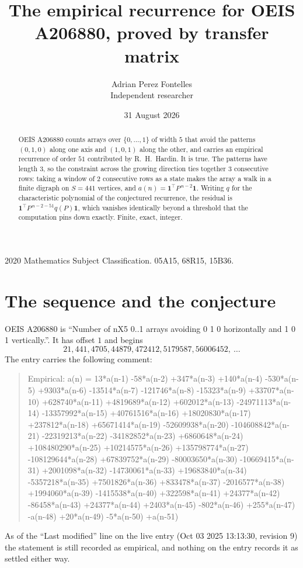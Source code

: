 \documentclass[11pt,a4paper]{article}
\title{The empirical recurrence for OEIS A206880, proved by transfer matrix}
\author{Adrian Perez Fontelles\\ \small Independent researcher}
\date{31 August 2026}
\theoremstyle{plain}
\theoremstyle{definition}
\begin{document}
\maketitle

\begin{abstract}
OEIS A206880 counts arrays over $\{0,\dots,1\}$ of width $5$ that avoid the patterns
$(0,1,0)$ along one axis and $(1,0,1)$ along the other, and carries an empirical recurrence of
order $51$ contributed by R.~H.~Hardin. It is true. The patterns have length $3$, so
the constraint across the growing direction ties together $3$ consecutive rows: taking a
window of $2$ consecutive rows as a state makes the array a walk in a finite digraph
on $S=441$ vertices, and $a(n)=\mathbf{1}^{\!\top}P^{\,n-2}\mathbf{1}$. Writing $q$
for the characteristic polynomial of the conjectured recurrence, the residual is
$\mathbf{1}^{\!\top}P^{\,n-2-51}q(P)\mathbf{1}$, which vanishes identically
beyond a threshold that the computation pins down exactly. Finite, exact, integer.
\end{abstract}

\noindent\small 2020 Mathematics Subject Classification. 05A15, 68R15, 15B36.\normalsize

\section{The sequence and the conjecture}

OEIS A206880 is ``Number of nX5 0..1 arrays avoiding 0 1 0 horizontally and 1 0 1 vertically.''. It has offset
$1$ and begins
\[
21, 441, 4705, 44879, 472412, 5179587, 56006452,\ \dots
\]
The entry carries the following comment:
\begin{quote}\small
Empirical: a(n) = 13*a(n-1) -58*a(n-2) +347*a(n-3) +140*a(n-4) -530*a(n-5) +9303*a(n-6) -13514*a(n-7) -121746*a(n-8) -15323*a(n-9) +33707*a(n-10) +628740*a(n-11) +4819689*a(n-12) +602012*a(n-13) -24971113*a(n-14) -13357992*a(n-15) +40761516*a(n-16) +18020830*a(n-17) +237812*a(n-18) +65671414*a(n-19) -52609938*a(n-20) -104608842*a(n-21) -22319213*a(n-22) -34182852*a(n-23) +6860648*a(n-24) +108480290*a(n-25) +10214575*a(n-26) +135798774*a(n-27) -108129644*a(n-28) +67839752*a(n-29) -80003650*a(n-30) -10669415*a(n-31) +2001098*a(n-32) -14730061*a(n-33) +19683840*a(n-34) -5357218*a(n-35) +7501826*a(n-36) +833478*a(n-37) -2016577*a(n-38) +1994060*a(n-39) -1415538*a(n-40) +322598*a(n-41) +24377*a(n-42) -86458*a(n-43) +24377*a(n-44) +2403*a(n-45) -802*a(n-46) +255*a(n-47) -a(n-48) +20*a(n-49) -5*a(n-50) +a(n-51)
\end{quote}
As of the ``Last modified'' line on the live entry (Oct 03 2025 13:13:30, revision
9) the statement is still recorded as empirical, and nothing on the entry
records it as settled either way.
\end{document}
